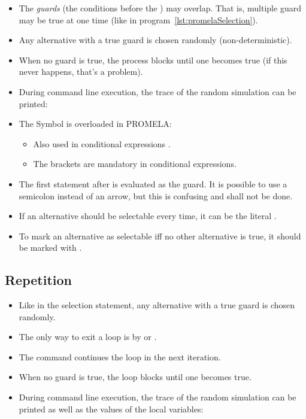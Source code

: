 		\begin{itemize}
			\item The \textit{guards} (the conditions before the \inlinePromela{->}) may overlap. That is, multiple guard may be true at one time (like in program~\ref{lst:promelaSelection}).
			\item Any alternative with a true guard is chosen randomly (non-deterministic).
			\item When no guard is true, the process blocks until one becomes true (if this never happens, that's a problem).
			\item During command line execution, the trace of the random simulation can be printed:
			\item The Symbol \inlinePromela{->} is overloaded in PROMELA:
				\begin{itemize}
					\item Also used in conditional expressions .
					\item The brackets are mandatory in conditional expressions.
				\end{itemize}
			\item The first statement after \inlinePromela{::} is evaluated as the guard. It is possible to use a semicolon instead of an arrow, but this is confusing and shall not be done.
			\item If an alternative should be selectable every time, it can be the literal .
			\item To mark an alternative as selectable iff no other alternative is true, it should be marked with .
		\end{itemize}

	\subsection{Repetition}
		

		\begin{itemize}
			\item Like in the selection statement, any alternative with a true guard is chosen randomly.
			\item The only way to exit a loop is by  or .
			\item The command  continues the loop in the next iteration.
			\item When no guard is true, the loop blocks until one becomes true.
			\item During command line execution, the trace of the random simulation can be printed as well as the values of the local variables:
		\end{itemize}


